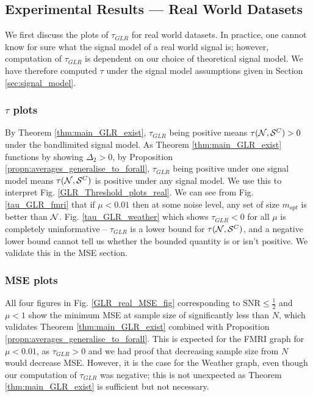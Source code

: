 \subsection{Experimental Results --- Real World Datasets}


We first discuss the plots of $\tau_{GLR}$ for real world datasets. In practice, one cannot know for sure what the signal model of a real world signal is; however, computation of $\tau_{GLR}$ is dependent on our choice of theoretical signal model. We have therefore computed $\tau$ under the signal model assumptions given in Section \ref{sec:signal_model}.  


\subsubsection{$\tau$ plots}
By Theorem \ref{thm:main_GLR_exist}, $\tau_{GLR}$ being positive means $\tau(\mathcal{N},\mathcal{S}^{C}) >0$ under the bandlimited signal model. As Theorem \ref{thm:main_GLR_exist} functions by showing $\Delta_{2} >0$, by Proposition \ref{propn:averages_generalise_to_forall}, $\tau_{GLR}$ being positive under one signal model means $\tau(\mathcal{N},\mathcal{S}^{C})$ is positive under any signal model. We use this to interpret Fig. \ref{GLR_Threshold_plots_real}.
We can see from Fig. \ref{tau_GLR_fmri} that if $\mu<0.01$ then at some noise level, any set of size $m_{opt}$ is better than $\mathcal{N}$. Fig. \ref{tau_GLR_weather} which shows $\tau_{GLR} < 0$ for all $\mu$ is completely uninformative -- $\tau_{GLR}$ is a lower bound for $\tau(\mathcal{N},\mathcal{S}^{C})$, and a negative lower bound cannot tell us whether the bounded quantity is or isn't positive. We validate this in the MSE section.

\subsubsection{MSE plots}
All four figures in Fig. \ref{GLR_real_MSE_fig} corresponding to $\text{SNR} \leq \frac{1}{2}$ and $\mu < 1$ show the minimum MSE at sample size of significantly less than $N$, which validates Theorem \ref{thm:main_GLR_exist} combined with Proposition \ref{propn:averages_generalise_to_forall}. This is expected for the FMRI graph for $\mu<0.01$, as $\tau_{GLR} > 0$ and we had proof that decreasing sample size from $N$ would decrease MSE. However, it is the case for the Weather graph, even though our computation of $\tau_{GLR}$ was negative; this is not unexpected as Theorem \ref{thm:main_GLR_exist} is sufficient but not necessary.


